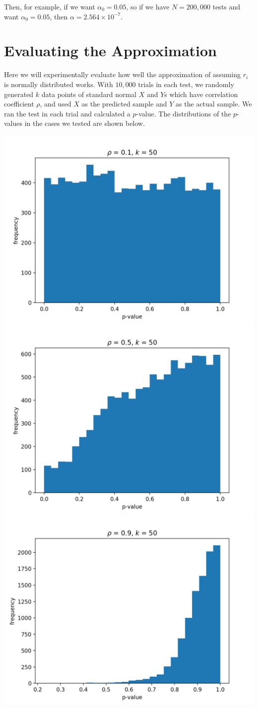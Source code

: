 \documentclass{article}
\begin{document}
Then, for example, if we want $\alpha_0 = 0.05$, so if we have $N = 200,000$ tests and want $\alpha_0 = 0.05$, then $\alpha = 2.564 \times 10^{-7}$.

\section{Evaluating the Approximation}

Here we will experimentally evaluate how well the approximation of assuming $r_i$ is normally distributed works. With $10,000$ trials in each test, we randomly generated $k$ data points of standard normal $X$ and $Y$s which have correlation coefficient $\rho$, and used $X$ as the predicted sample and $Y$ as the actual sample. We ran the test in each trial and calculated a $p$-value. The distributions of the $p$-values in the cases we tested are shown below.

\includegraphics[width=0.33\linewidth]{rho01k50.png}
\includegraphics[width=0.33\linewidth]{rho05k50.png}
\includegraphics[width=0.33\linewidth]{rho09k50.png}
\end{document}
